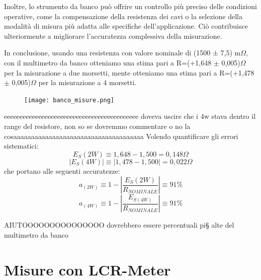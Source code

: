 Inoltre, lo strumento da banco può offrire un controllo più preciso delle condizioni operative, come la compensazione della resistenza dei cavi o la selezione della modalità di misura più adatta alle specifiche dell'applicazione. Ciò contribuisce ulteriormente a migliorare l'accuratezza complessiva della misurazione.

In conclusione, usando una resistenza con valore nominale di (1500 ± 7,5) m$\Omega$, con il multimetro da banco otteniamo una stima pari a R=(+1,648 $\pm$ 0,005)$\Omega$ per la misurazione a due morsetti, mente otteniamo una stima pari a R=(+1,478 $\pm$ 0,005)$\Omega$ per la misurazione a 4 morsetti.

\begin{figure}[h]
    \centering
    \texttt{[image: banco\_misure.png]}
    \label{fig:range}
\end{figure}

eeeeeeeeeeeeeeeeeeeeeeeeeeeeeeeeeeeeeeeeeee doveva uscire che i 4w stava dentro il range del resistore, non so se dovremmo commentare o no la cosaaaaaaaaaaaaaaaaaaaaaaaaaaaaaaaaaaaaa
\newline
Volendo quantificare gli errori sistematici:
\begin{equation}
    E_S(2W) \equiv 1,648 - 1,500 = 0,148 \Omega
\end{equation}
\begin{equation}
    | E_S(4W) | \equiv | 1,478 - 1,500  |= 0,022 \Omega
\end{equation}
che portano alle seguenti accuratezze: 
\begin{equation}
    a_(2W) \equiv 1 - | \frac{E_S(2W)}{R_{NOMINALE}} | \equiv 91\%
\end{equation}
\begin{equation}
    a_(4W) \equiv 1 - | \frac{E_{S(4W)}}{R_{NOMINALE}} | \equiv 91\%
\end{equation}

AIUTOOOOOOOOOOOOOOO dovrebbero essere percentuali pi§ alte del multimetro da banco














\section{Misure con LCR-Meter}
\label{sec:lcr}

